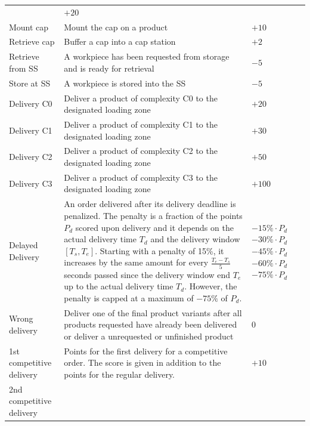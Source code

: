 \documentclass[12pt,twoside]{article}
\begin{document}
{\begin{longtable}{p{}
    |p{}
    |p{}}
        & $+20$
        \\
        Mount cap & Mount the cap on a product & $+10$
        \\
        Retrieve cap & Buffer a cap into a cap station & $+2$
        \\
        Retrieve from \ac{SS}
        & A workpiece has been requested from storage and is ready for retrieval
        & $-5$
        \\
        Store at \ac{SS}
        & A workpiece is stored into the \ac{SS}
        & $-5$
        \\
        Delivery C0
        & Deliver a product of complexity C0 to the designated loading
        zone
        & $+20$
        \\
        Delivery C1
        & Deliver a product of complexity C1 to the designated loading
        zone
        & $+30$
        \\
        Delivery C2
        & Deliver a product of complexity C2 to the designated loading
        zone
        & $+50$
        \\
        Delivery C3
        & Deliver a product of complexity C3 to the designated loading
        zone
        & $+100$
        \\
        Delayed Delivery & An order delivered after its delivery deadline is
        penalized. The penalty is a fraction of the points $P_d$
        scored upon delivery and it depends on the actual
        delivery time $T_d$ and the delivery window $[T_s, T_e]$.
        Starting with a penalty of 15\%, it increases by the same amount for
        every $\frac{T_e-T_s}{5}$ seconds passed since
        the delivery window end $T_e$ up to the actual delivery time $T_d$.
        However, the penalty is capped at a maximum of $- 75\%$ of $P_d$.
        &
        $-15\%\cdot P_d$
        $-30\%\cdot P_d$
        $-45\%\cdot P_d$
        $-60\%\cdot P_d$
        $-75\%\cdot P_d$
        \phantom{$-75\%\cdot P_d$} %
        \\
        Wrong delivery & Deliver one of the final product variants after all
        products requested have already been delivered or deliver a unrequested
        or unfinished product
        & $0$
        \\
        1st competitive delivery
        & Points for the first delivery for a competitive order. The score is
        given in addition to the points for the regular delivery.
        &$+ 10$
        \\
        2nd competitive delivery

\end{longtable}}
\end{document}
